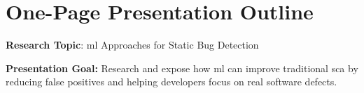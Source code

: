 \newpage
\section{One-Page Presentation Outline}





\noindent\textbf{Research Topic}: \gls{ml} Approaches for Static Bug Detection

\vspace{0.5em}

\noindent\textbf{Presentation Goal:} Research and expose how \gls{ml} can improve traditional \gls{sca} by reducing false positives and helping developers focus on real software defects.

\vspace{0.5em}

